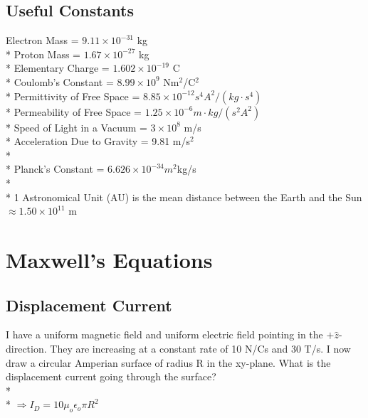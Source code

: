 \documentclass[11pt]{article}
\begin{document}
\maketitle
\tableofcontents
\vspace{50pt}

\subsection*{Useful Constants}
Electron Mass = $9.11 \times 10^{-31}$ kg \\*
Proton Mass = $1.67 \times 10^{-27}$ kg \\*
Elementary Charge = $1.602 \times 10^{-19}$ C \\*
Coulomb's Constant = $8.99 \times 10^9$ Nm$^2$/C$^2$ \\*
Permittivity of Free Space = $8.85 \times 10^{-12} s^4 A^2 / (kg \cdot s^4)$ \\*
Permeability of Free Space = $1.25 \times 10^{-6} m \cdot kg / (s^2 A^2)$ \\*
Speed of Light in a Vacuum = $3 \times 10^8$ m/s \\*
Acceleration Due to Gravity = 9.81 m/s$^2$ \\* \\*
Planck's Constant = $6.626 \times 10^{-34} m^2$kg/s \\* \\*
1 Astronomical Unit (AU) is the mean distance between the Earth and the Sun $\approx 1.50 \times 10^{11}$ m 


\pagebreak
\section{Maxwell's Equations}
\vspace{10pt}

\subsection{Displacement Current}
I have a uniform magnetic field and uniform electric field pointing in the $+\hat{z}$-direction.  They are increasing at a constant rate of 10 N/Cs and 30 T/s.  I now draw a circular Amperian surface of radius R in the xy-plane.  What is the displacement current going through the surface? \\* \\*
$\Rightarrow I_D = 10 \mu_o \epsilon_o \pi R^2$
\end{document}
